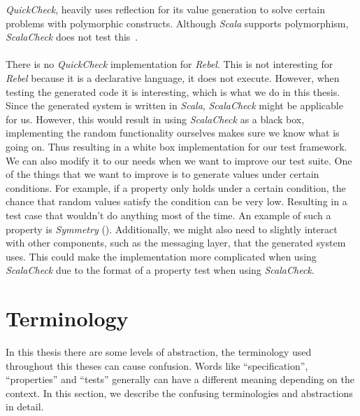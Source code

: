 \textit{QuickCheck}, heavily uses reflection for its value generation to solve
certain problems with polymorphic constructs. Although \textit{Scala} supports
polymorphism, \textit{ScalaCheck} does not test this~\cite{kang2011fortresscheck}.\\
\\
There is no \textit{QuickCheck} implementation for \textit{Rebel}. This is not interesting for \textit{Rebel} because it is a declarative language, it does not execute. However, when testing the generated code it is interesting, which is what we do in this thesis. Since the
generated system is written in \textit{Scala}, \textit{ScalaCheck} might be
applicable for us. However, this would result in using \textit{ScalaCheck} as a
black box, implementing the random functionality ourselves makes sure we know
what is going on. Thus resulting in a white box implementation for our test
framework.%
We can also modify it to our needs when we want to improve our test suite. One
of the things that we want to improve is to generate values under certain
conditions. For example, if a property only holds under a certain condition, the
chance that random values satisfy the condition can be very low. Resulting in a
test case that wouldn't do anything most of the time. An example of such a
property is \textit{Symmetry} (). %
Additionally, we might also need to slightly interact with other components,
such as the messaging layer, that the generated system uses. This could make the
implementation more complicated when using \textit{ScalaCheck} due to the format
of a property test when using \textit{ScalaCheck}.

\section{Terminology}
\label{sct:background_terminology}
In this thesis there are some levels of abstraction, the terminology used
throughout this theses can cause confusion. Words like ``specification'',
``properties'' and ``tests'' generally can have a different meaning depending on the
context. In this section, we describe the confusing terminologies and
abstractions in detail.

